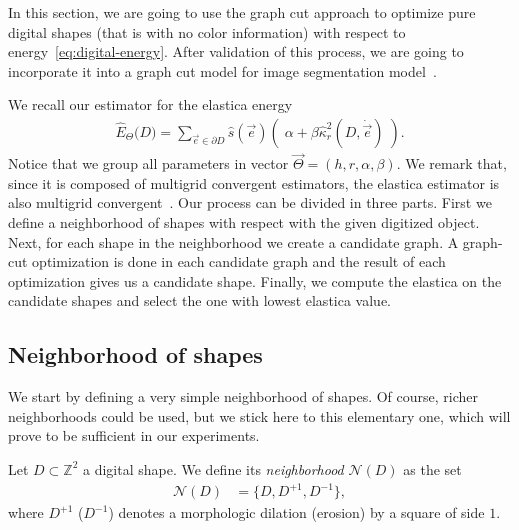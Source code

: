 \documentclass{siamart220329}
\newcommand{\digset}{D} %
\begin{document}
In this section, we are going to use the graph cut approach
to optimize pure digital shapes (that is with no color information) with
respect to energy~\eqref{eq:digital-energy}. After validation of this
process, we are going to incorporate it into a graph cut model for 
image segmentation model~\cite{boykov01graphcut}. 

%
%
We recall our estimator for the elastica energy 
%
\begin{align}
    \hat{E}_{\Theta}\big( \digset \big) = \sum_{\vec{e} \in \partial \digset}{
    \hat{s}(\vec{e})\left(\; \alpha + \beta
    \hat{\kappa}_{r}^2(\digset,\dot{\vec{e}}) \; \right)}.
	\label{eq:elastica-estimator-2}
\end{align}
%
%
Notice that we group all parameters in vector $\vec{\Theta}=(h,r,\alpha,\beta)$.
We remark that, since it is composed of multigrid convergent estimators, the
elastica estimator is also multigrid convergent~\cite{lachaud06hdr}.
%
Our process can be divided in three parts. First we define a
neighborhood of shapes with respect with the given digitized object. Next, for
each shape in the neighborhood we create a candidate graph. A graph-cut
optimization is done in each candidate graph and the result of each
optimization gives us a candidate shape. Finally, we compute the elastica on
the candidate shapes and select the one with lowest elastica value. 
%    
%
%
%
\subsection{Neighborhood of shapes}
%
%
We start by defining a very simple neighborhood of shapes. Of course, richer
neighborhoods could be used, but we stick here to this elementary one, which
will prove to be sufficient in our experiments.
%
%
\begin{definition}
    Let $\digset \subset \mathbb{Z}^2$ a digital shape. We define its {\em
    neighborhood}  $\mathcal{N}(\digset)$ as the set
	\begin{align*}
		\mathcal{N}(\digset) &= \Big\{\digset, \digset^{+1},\digset^{-1} \big\},
	\end{align*}
    where $\digset^{+1}$ ($\digset^{-1}$) denotes a morphologic dilation (erosion) by a
    square of side $1$.
\end{definition}
%
%
\end{document}
